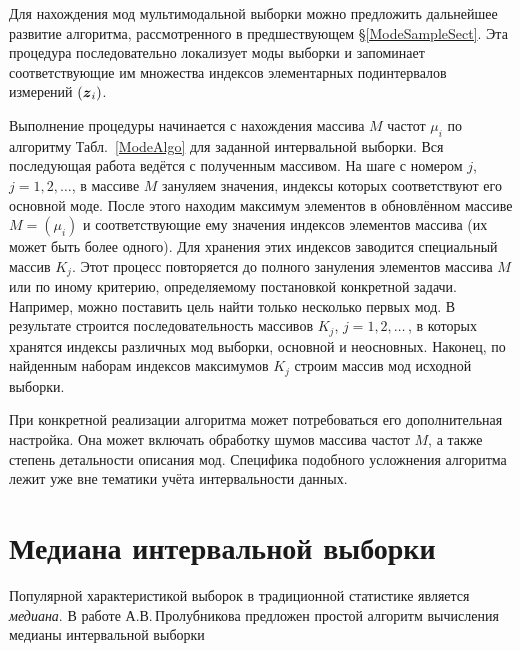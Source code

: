 \documentclass[a5paper,openany]{book}
\newcommand{\mbf}[1]{\protect\text{\boldmath$#1$}}
\begin{document}
  
Для нахождения мод мультимодальной выборки можно предложить дальнейшее развитие алгоритма, 
рассмотренного в предшествующем \S\ref{ModeSampleSect}. Эта процедура последовательно 
локализует моды выборки и запоминает соответствующие им множества индексов элементарных 
подинтервалов измерений $(\mbf{z}_{i})$. 
  
Выполнение процедуры начинается с нахождения массива $M$ частот $\mu_i$ по алгоритму 
Табл.~\ref{ModeAlgo} для заданной интервальной выборки. Вся последующая работа ведётся 
с полученным массивом. На шаге с номером $j$, $j = 1,2,\ldots$, в массиве $M$ зануляем 
значения, индексы которых соответствуют его основной моде. После этого находим максимум 
элементов в обновлённом массиве $M = (\mu_{i})$ и соответствующие ему значения индексов 
элементов массива (их может быть более одного). Для хранения этих индексов заводится 
специальный массив $K_j$. Этот процесс повторяется до полного зануления элементов массива 
$M$ или по иному критерию, определяемому постановкой конкретной задачи. Например, можно 
поставить цель найти только несколько первых мод. В результате строится последовательность 
массивов $K_j$, $j = 1,2,\ldots\,$, в которых хранятся индексы различных мод выборки, 
основной и неосновных. Наконец, по найденным наборам индексов максимумов $K_j$ строим 
массив мод исходной выборки. 
  
При конкретной реализации алгоритма может потребоваться его дополнительная настройка. 
Она может включать обработку шумов массива частот $M$, а также степень детальности 
описания мод. Специфика подобного усложнения алгоритма лежит уже вне тематики учёта 
интервальности данных. 
  
  
\section{Медиана интервальной выборки} 
   
   
Популярной характеристикой выборок в традиционной статистике является \emph{медиана}.  
 В работе А.В.\,Пролубникова предложен простой алгоритм вычисления 
медианы интервальной выборки 
  
  
\end{document}
